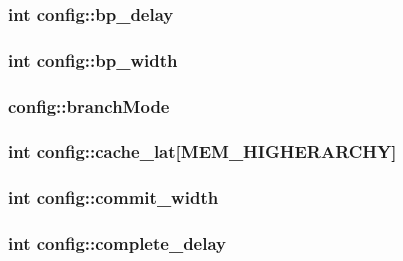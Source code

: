 \label{classconfig_a44f960416e7b458fe0d8c9fb0712d905}
\hypertarget{classconfig_ac32c79ca2541862ab10e332835726ac7}{
\subsubsection[{bp\_\-delay}]{\setlength{\rightskip}{0pt plus 5cm}int {\bf config::bp\_\-delay}}}
\label{classconfig_ac32c79ca2541862ab10e332835726ac7}
\hypertarget{classconfig_aa1361f6a730b6a397cbc0eab017b8370}{
\subsubsection[{bp\_\-width}]{\setlength{\rightskip}{0pt plus 5cm}int {\bf config::bp\_\-width}}}
\label{classconfig_aa1361f6a730b6a397cbc0eab017b8370}
\hypertarget{classconfig_a504ac31b890e1ae3ecf5ec1ab99621b3}{
\subsubsection[{branchMode}]{ {\bf config::branchMode}}}
\label{classconfig_a504ac31b890e1ae3ecf5ec1ab99621b3}
\hypertarget{classconfig_a18d19c63e34e1d1bf73dce6d945ad624}{
\subsubsection[{cache\_\-lat}]{\setlength{\rightskip}{0pt plus 5cm}int {\bf config::cache\_\-lat}\mbox{[}MEM\_\-HIGHERARCHY\mbox{]}}}
\label{classconfig_a18d19c63e34e1d1bf73dce6d945ad624}
\hypertarget{classconfig_ac81423700e2794fa5031ab254ff6204d}{
\subsubsection[{commit\_\-width}]{\setlength{\rightskip}{0pt plus 5cm}int {\bf config::commit\_\-width}}}
\label{classconfig_ac81423700e2794fa5031ab254ff6204d}
\hypertarget{classconfig_a369164f22ea95fa960db882496fdb362}{
\subsubsection[{complete\_\-delay}]{\setlength{\rightskip}{0pt plus 5cm}int {\bf config::complete\_\-delay}}}
